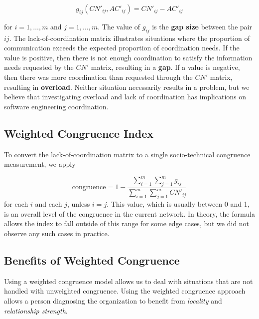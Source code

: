  \[ g_{ij}(CN'_{ij}, AC'_{ij}) = CN'_{ij} - AC'_{ij} \]

\noindent for $i=1,\dots,m$ and $j=1,\dots,m$. The value of $g_{ij}$ is the \textbf{gap size} between the pair $ij$. The lack-of-coordination matrix illustrates situations where the proportion of communication exceeds the expected proportion of coordination needs. If the value is positive, then there is not enough coordination to satisfy the information needs requested by the $CN'$ matrix, resulting in a \textbf{gap}. If a value is negative, then there was more coordination than requested through the $CN'$ matrix, resulting in \textbf{overload}.  Neither situation necessarily results in a problem, but we believe that investigating overload and lack of coordination has implications on software engineering coordination.


\subsection{Weighted Congruence Index}


To convert the lack-of-coordination matrix to a single socio-technical congruence measurement, we apply

\[ \text{congruence} = 1 - \frac{\displaystyle\sum^{m}_{i=1} \sum^{m}_{j=1} g_{ij}}{\displaystyle\sum^{m}_{i=1}\sum^{m}_{j=1}CN'_{ij}} \]
\noindent for each $i$ and each $j$, unless $i=j$. This value, which is usually between 0 and 1, is an overall level of the congruence in the current network. In theory, the formula allows the index to fall outside of this range for some edge cases, but we did not observe any such cases in practice.


\subsection{Benefits of Weighted Congruence}
\label{sec:benefit}

Using a weighted congruence model allows us to deal with situations that are not handled with unweighted congruence.
Using the weighted congruence approach allows a person diagnosing the organization to benefit from \emph{locality} and \emph{relationship strength}.

